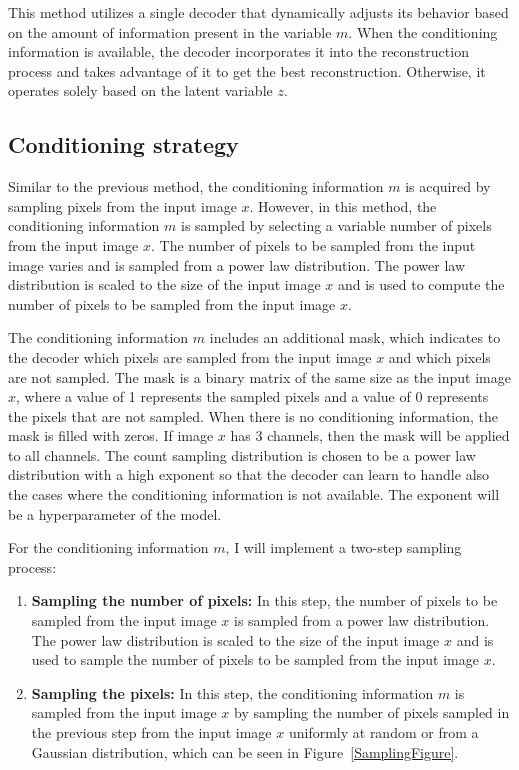 This method utilizes a single decoder that dynamically adjusts its behavior
based on the amount of information present in the variable $m$. When the
conditioning information is available, the decoder incorporates it into the
reconstruction process and takes advantage of it to get the best
reconstruction. Otherwise, it operates solely based on the latent variable $z$.

\subsection{Conditioning strategy}

Similar to the previous method, the conditioning information $m$ is acquired by sampling pixels from the input image $x$. However, in this method, the conditioning information $m$ is sampled by selecting a variable number of pixels from the input image $x$. The number of pixels to be sampled from the input image varies and is sampled from a power law distribution. The power law distribution is scaled to the size of the input image $x$ and is used to compute the number of pixels to be sampled from the input image $x$.

The conditioning information $m$ includes an additional mask, which indicates to the decoder which pixels are sampled from the input image $x$ and which pixels are not sampled. The mask is a binary matrix of the same size as the input image $x$, where a value of 1 represents the sampled pixels and a value of 0 represents the pixels that are not sampled. When there is no conditioning information, the mask is filled with zeros. If image $x$ has 3 channels, then the mask will be applied to all channels. The count sampling distribution is chosen to be a power law distribution with a high exponent so that the decoder can learn to handle also the cases where the conditioning information is not available. The exponent will be a hyperparameter of the model.

For the conditioning information $m$, I will implement a two-step sampling process:

\begin{enumerate}
    \item \textbf{Sampling the number of pixels:} In this step, the number of pixels to be sampled from the input image $x$ is sampled from a power law distribution. The power law distribution is scaled to the size of the input image $x$ and is used to sample the number of pixels to be sampled from the input image $x$.
    \item \textbf{Sampling the pixels:} In this step, the conditioning information $m$ is sampled from the input image $x$ by sampling the number of pixels sampled in the previous step from the input image $x$ uniformly at random or from a Gaussian distribution, which can be seen in Figure~\ref{SamplingFigure}.
\end{enumerate}

